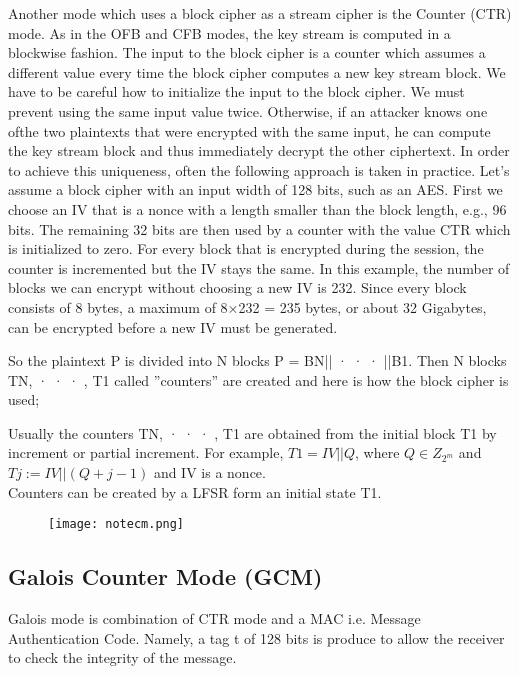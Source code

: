\documentclass{article}
\begin{document}
Another mode which uses a block cipher as a stream cipher is the Counter (CTR)
mode. As in the OFB and CFB modes, the key stream is computed in a blockwise
fashion. The input to the block cipher is a counter which assumes a different value
every time the block cipher computes a new key stream block.
We have to be careful how to initialize the input to the block cipher. We must
prevent using the same input value twice. Otherwise, if an attacker knows one ofthe two plaintexts that were encrypted with the same input, he can compute the key
stream block and thus immediately decrypt the other ciphertext. In order to achieve
this uniqueness, often the following approach is taken in practice. Let’s assume a
block cipher with an input width of 128 bits, such as an AES. First we choose
an IV that is a nonce with a length smaller than the block length, e.g., 96 bits.
The remaining 32 bits are then used by a counter with the value CTR which is
initialized to zero. For every block that is encrypted during the session, the counter
is incremented but the IV stays the same. In this example, the number of blocks we
can encrypt without choosing a new IV is 232. Since every block consists of 8 bytes,
a maximum of 8×232 = 235 bytes, or about 32 Gigabytes, can be encrypted before
a new IV must be generated.

\vspace{1cm}
So the plaintext P is divided into N blocks P = BN|| · · · ||B1. Then N blocks TN, · · · , T1 called ”counters” are created and here is how the block cipher is used;


Usually the counters TN, · · · , T1 are obtained from the initial block T1 by increment or partial
increment. For example, $T1 = IV ||Q$, where $Q \in Z_{2^m}$ and $Tj := IV ||(Q + {j - 1})$ and IV is a nonce.\\

Counters can be created by a LFSR form an initial state T1.

\begin{figure}[H]
    \centering
    \texttt{[image: notecm.png]}
\end{figure}

\subsection{Galois Counter Mode (GCM)}

Galois mode is combination of CTR mode and a MAC i.e. Message Authentication Code. Namely,
a tag t of 128 bits is produce to allow the receiver to check the integrity of the message.\\
\end{document}

